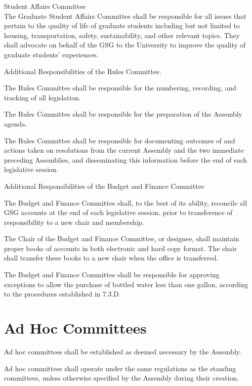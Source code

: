 \begin{bylaws-number}
\begin{bylaws-number}
  \item Student Affairs Committee \hfill \\
The Graduate Student Affairs Committee shall be responsible for all issues that pertain to the quality of life of graduate students including but not limited to housing, transportation, safety, sustainability, and other relevant topics. They shall advocate on behalf of the GSG to the University to improve the quality of graduate students’ experiences.
  \end{bylaws-number}
  \item Additional Responsibilities of the Rules Committee.
  \begin{bylaws-number}
    \item The Rules Committee shall be responsible for the numbering, recording, and tracking of all legislation.
    \item The Rules Committee shall be responsible for the preparation of the Assembly agenda.
    \item The Rules Committee shall be responsible for documenting outcomes of and actions taken on resolutions from the current Assembly and the two immediate preceding Assemblies, and disseminating this information before the end of each legislative session.
  \end{bylaws-number}
  \item Additional Responsibilities of the Budget and Finance Committee
  \begin{bylaws-number}
    \item The Budget and Finance Committee shall, to the best of its ability, reconcile all GSG accounts at the end of each legislative session, prior to transference of responsibility to a new chair and membership.
    \item The Chair of the Budget and Finance Committee, or designee, shall maintain proper books of accounts in both electronic and hard copy format. The chair shall transfer these books to a new chair when the office is transferred.
    \item The Budget and Finance Committee shall be responsible for approving exceptions to allow the purchase of bottled water less than one gallon, according to the procedures established in 7.3.D.
  \end{bylaws-number}
\end{bylaws-number}

\section{Ad Hoc Committees}
\begin{bylaws-number}
  \item Ad hoc committees shall be established as deemed necessary by the Assembly.
  \item Ad hoc committees shall operate under the same regulations as the standing committees, unless otherwise specified by the Assembly during their creation.
\end{bylaws-number}

